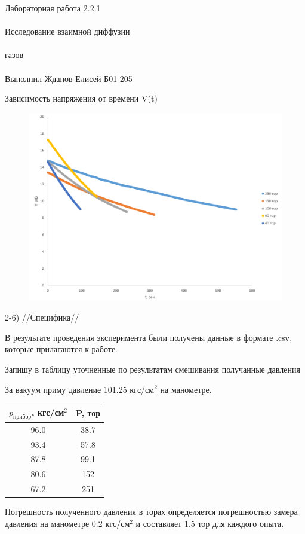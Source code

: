 \documentclass{astroedu-lab}
\begin{document}
\begin{problem}{\huge Лабораторная работа 2.2.1\\\\Исследование взаимной диффузии\\\\газов\\\\Выполнил Жданов Елисей Б01-205}
\begin{center}
	\Large Зависимость напряжения от времени V(t)
\end{center}

\begin{figure}[!h]
	\centering
	\includegraphics[width=1\textwidth]{линейный.png}
	\label{fig:boiler}
\end{figure}

2-6) //Специфика//

В результате проведения эксперимента были получены данные в формате .csv, которые прилагаются к работе.

Запишу в таблицу уточненные по результатам смешивания получанные давления

За вакуум приму давление 101.25 кгс/см$^2$ на манометре.

\begin{center}
\begin{tabular}{|c|c|}
\hline 
$p_\text{прибор}$, кгс/см$^2$ & P, тор \\
\hline
96.0 & 38.7 \\
93.4 & 57.8 \\
87.8 & 99.1 \\
80.6 & 152 \\
67.2 & 251 \\
\hline
\end{tabular}
\end{center}

Погрешность полученного давления в торах определяется погрешностью замера давления на манометре 0.2 кгс/см$^2$ и составляет 1.5 тор для каждого опыта.


\end{problem}
\end{document}
